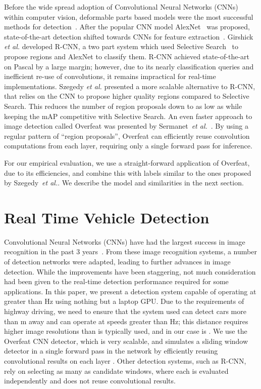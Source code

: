 \documentclass[journal]{IEEEtran}
\begin{document}
Before the wide spread adoption of Convolutional Neural Networks (CNNs) within computer vision, deformable parts based models were the most successful methods for detection~\cite{felzenszwalb-2010}. After the popular CNN model AlexNet~\cite{krizhevsky-2012} was proposed, state-of-the-art detection shifted towards CNNs for feature extraction~\cite{sermanet-2013,szegedy-2014,szegedy-2013,girshick-2014}. Girshick \textit{et al.} developed R-CNN, a two part system which used Selective Search~\cite{uijlings-2013} to propose regions and AlexNet to classify them. R-CNN achieved state-of-the-art on Pascal by a large margin; however, due to its nearly  classification queries and inefficient re-use of convolutions, it remains impractical for real-time implementations. Szegedy \textit{et al.} presented a more scalable alternative to R-CNN, that relies on the CNN to propose higher quality regions compared to Selective Search. This reduces the number of region proposals down to as low as  while keeping the mAP competitive with Selective Search. An even faster approach to image detection called Overfeat was presented by Sermanet~\textit{et al.}~\cite{sermanet-2013}. By using a regular pattern of ``region proposals'', Overfeat can efficiently reuse convolution computations from each layer, requiring only a single forward pass for inference.  
 
For our empirical evaluation, we use a straight-forward application of Overfeat, due to its efficiencies, and combine this with labels similar to the ones proposed by Szegedy~\textit{et al.}. We describe the model and similarities in the next section. 
 
\section{Real Time Vehicle Detection}
Convolutional Neural Networks (CNNs) have had the largest success in image recognition in the past 3 years~\cite{krizhevsky-2012,szegedy-2014-inception,he-2015,simonyan-2014}. From these image recognition systems, a number of detection networks were adapted, leading to further advances in image detection. While the improvements have been staggering, not much consideration had been given to the real-time detection performance required for some applications. In this paper, we present a detection system capable of operating at greater than Hz using nothing but a laptop GPU. Due to the requirements of highway driving, we need to ensure that the system used can detect cars more than m away and can operate at speeds greater than Hz; this distance requires higher image resolutions than is typically used, and in our case is . We use the Overfeat CNN detector, which is very scalable, and simulates a sliding window detector in a single forward pass in the network by efficiently reusing convolutional results on each layer \cite{sermanet-2013}. Other detection systems, such as R-CNN, rely on selecting as many as  candidate windows, where each is evaluated independently and does not reuse convolutional results. 
\end{document}
